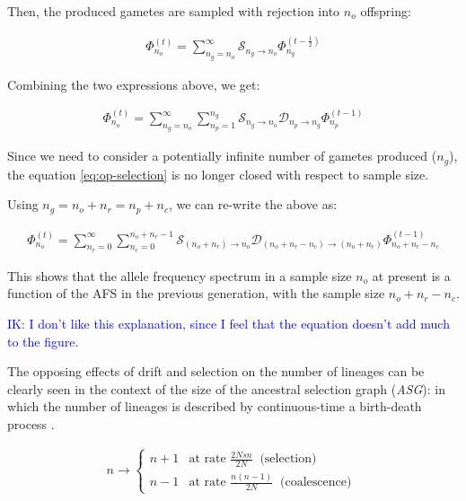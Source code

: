 \documentclass[review]{elsarticle}
\newcommand{\ra}{\rightarrow}
\newcommand{\afs}[2]{\Phi_{#1}^{(#2)}}
\newcommand{\ikcomment}[1]{\textcolor{blue}{IK: #1}}
\begin{document}
Then, the produced gametes are sampled with rejection into $n_o$ offspring:

\begin{align*}
  \afs{n_o}{t} = \sum_{n_g=n_o}^{\infty}\mathcal{S}_{n_g\ra n_o} \afs{n_g}{t-\frac{1}{2}}
\end{align*}

Combining the two expressions above, we get:

\begin{align}
  \label{eq:op-selection}
  \afs{n_o}{t} = \sum_{n_g=n_o}^{\infty} \sum_{n_p=1}^{n_g} \mathcal{S}_{n_g\ra n_o}  \mathcal{D}_{n_p\ra n_g} \afs{n_p}{t-1}
\end{align}

Since we need to consider a potentially infinite number of gametes produced ($n_g$), the equation
\eqref{eq:op-selection} is no longer closed with respect to sample size.

Using $n_g=n_o+n_r=n_p+n_c$, we can re-write the above as:

\begin{align}
  \label{eq:op-selection}
  \afs{n_o}{t} = \sum_{n_r=0}^{\infty} \sum_{n_c=0}^{n_o+n_r-1} \mathcal{S}_{(n_o+n_r) \ra n_o} \mathcal{D}_{(n_o+n_r-n_c)\ra (n_o+n_r)} \afs{n_o+n_r-n_c}{t-1}
\end{align}

This shows that the allele frequency spectrum in a sample size $n_o$ at present is a function of the
AFS in the previous generation, with the sample size $n_o+n_r-n_c$.

\ikcomment{I don't like this explanation, since I feel that the equation doesn't add much to the
  figure.}


The opposing effects of drift and selection on the number of lineages can be clearly seen in the
context of the size of the ancestral selection graph (\textit{ASG}): in which the number of lineages
is described by continuous-time a birth-death process \citep{KroneNeuhauser1997, Wakeley2009}.

\begin{align}
  \label{eq:asg-size}
  n \ra \begin{cases}
    n+1 & \text{at rate } \frac{2 N s n}{2 N} ~ \text{ (selection) }\\
    n-1 & \text{at rate } \frac{n(n-1)}{2 N}   ~ \text{ (coalescence) }
  \end{cases}
\end{align}
\end{document}
